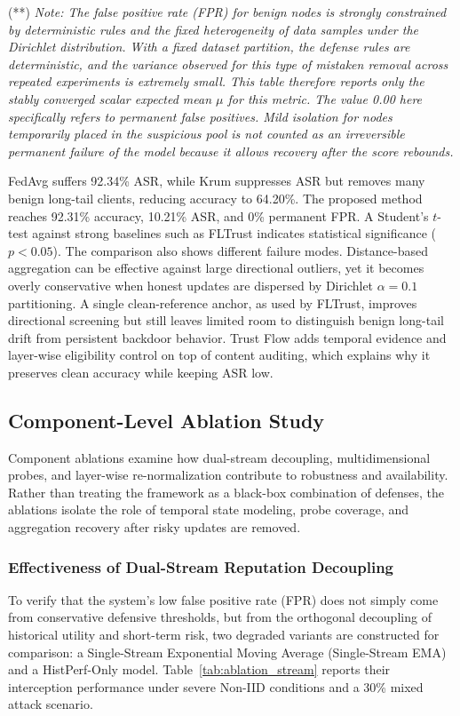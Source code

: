 \documentclass[final,5p,times,twocolumn]{elsarticle/elsarticle}
\begin{document}
\begin{table}[t]
\begin{threeparttable}
\begin{tablenotes}
            \item (**) \textit{Note: The false positive rate (FPR) for benign nodes is strongly constrained by deterministic rules and the fixed heterogeneity of data samples under the Dirichlet distribution. With a fixed dataset partition, the defense rules are deterministic, and the variance observed for this type of mistaken removal across repeated experiments is extremely small. This table therefore reports only the stably converged scalar expected mean $\mu$ for this metric. The value 0.00 here specifically refers to permanent false positives. Mild isolation for nodes temporarily placed in the suspicious pool is not counted as an irreversible permanent failure of the model because it allows recovery after the score rebounds.}
        \end{tablenotes}
    \end{threeparttable}
\end{table}

FedAvg suffers 92.34\% ASR, while Krum suppresses ASR but removes many benign long-tail clients, reducing accuracy to 64.20\%. The proposed method reaches 92.31\% accuracy, 10.21\% ASR, and 0\% permanent FPR. A Student's $t$-test against strong baselines such as FLTrust indicates statistical significance ($p<0.05$). The comparison also shows different failure modes. Distance-based aggregation can be effective against large directional outliers, yet it becomes overly conservative when honest updates are dispersed by Dirichlet $\alpha=0.1$ partitioning. A single clean-reference anchor, as used by FLTrust, improves directional screening but still leaves limited room to distinguish benign long-tail drift from persistent backdoor behavior. Trust Flow adds temporal evidence and layer-wise eligibility control on top of content auditing, which explains why it preserves clean accuracy while keeping ASR low.

\subsection{Component-Level Ablation Study}
Component ablations examine how dual-stream decoupling, multidimensional probes, and layer-wise re-normalization contribute to robustness and availability. Rather than treating the framework as a black-box combination of defenses, the ablations isolate the role of temporal state modeling, probe coverage, and aggregation recovery after risky updates are removed.

\subsubsection{Effectiveness of Dual-Stream Reputation Decoupling}
To verify that the system's low false positive rate (FPR) does not simply come from conservative defensive thresholds, but from the orthogonal decoupling of historical utility and short-term risk, two degraded variants are constructed for comparison: a Single-Stream Exponential Moving Average (Single-Stream EMA) and a HistPerf-Only model. Table~\ref{tab:ablation_stream} reports their interception performance under severe Non-IID conditions and a 30\% mixed attack scenario.
\end{document}
